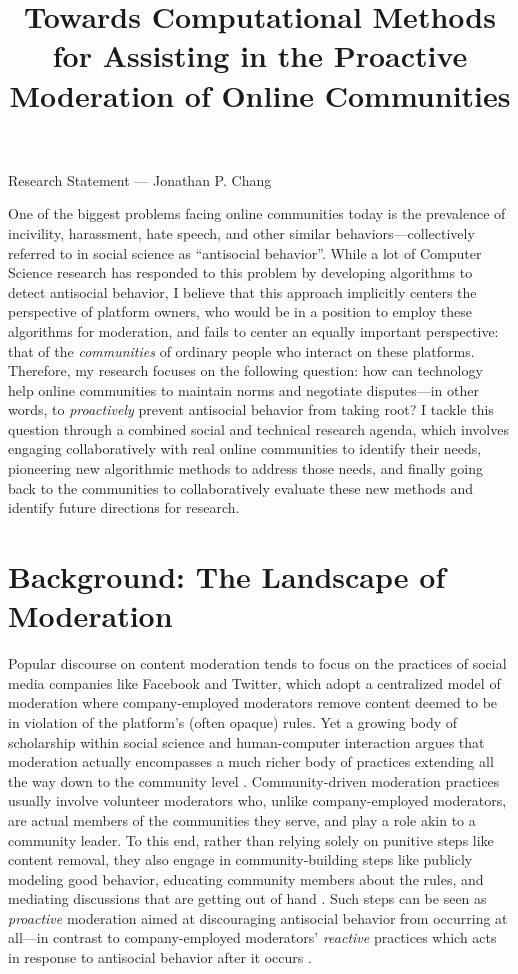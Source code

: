 \documentclass[11pt,letterpaper]{article}
\title{Towards Computational Methods for Assisting in the Proactive Moderation of Online Communities}
\begin{document}
\maketitle

\begin{center}
Research Statement --- Jonathan P. Chang
\end{center}

One of the biggest problems facing online communities today is the prevalence of incivility, harassment, hate speech, and other similar behaviors---collectively referred to in social science as ``antisocial behavior''.
While a lot of Computer Science research has responded to this problem by developing algorithms to detect antisocial behavior, I believe that this approach implicitly centers the perspective of platform owners, who would be in a position to employ these algorithms for moderation, and fails to center an equally important perspective: that of the \emph{communities} of ordinary people who interact on these platforms.
Therefore, my research focuses on the following question: how can technology help online communities to maintain norms and negotiate disputes---in other words, to \emph{proactively} prevent antisocial behavior from taking root?
I tackle this question through a combined social and technical research agenda, which involves engaging collaboratively with real online communities to identify their needs, pioneering new algorithmic methods to address those needs, and finally going back to the communities to collaboratively evaluate these new methods and identify future directions for research.

\section{Background: The Landscape of Moderation}

Popular discourse on content moderation tends to focus on the practices of social media companies like Facebook and Twitter, which adopt a centralized model of moderation where company-employed moderators remove content deemed to be in violation of the platform's (often opaque) rules.
Yet a growing body of scholarship within social science and human-computer interaction argues that moderation actually encompasses a much richer body of practices extending all the way down to the community level \cite{brewer_inclusion_2020,lampe_slashdot_2004,seering_reconsidering_2020}.
Community-driven moderation practices usually involve volunteer moderators who, unlike company-employed moderators, are actual members of the communities they serve, and play a role akin to a community leader.
To this end, rather than relying solely on punitive steps like content removal, they also engage in community-building steps like publicly modeling good behavior, educating community members about the rules, and mediating discussions that are getting out of hand \cite{seering_shaping_2017,billings_understanding_2010}.
Such steps can be seen as \emph{proactive} moderation aimed at discouraging antisocial behavior from occurring at all---in contrast to company-employed moderators' \emph{reactive} practices which acts in response to antisocial behavior after it occurs \cite{lo_when_2018}.
\end{document}
